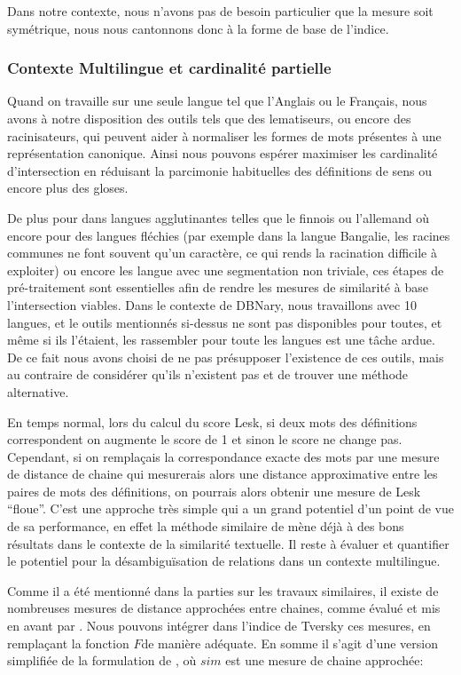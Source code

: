\documentclass[10pt,a4paper,twoside]{article}
\begin{document}
Dans notre contexte, nous n'avons pas de besoin particulier que la mesure soit symétrique, nous nous cantonnons donc à la forme de base de l'indice. 
 
\subsubsection{Contexte Multilingue et cardinalité partielle}
Quand on travaille sur une seule langue tel que l'Anglais ou le Français, nous avons à notre disposition des outils tels que des lematiseurs, ou encore des racinisateurs, qui peuvent aider à normaliser les formes de mots présentes à une représentation canonique. Ainsi nous pouvons espérer maximiser les cardinalité d'intersection en réduisant la parcimonie habituelles des définitions de sens ou encore plus des gloses. 

De plus pour dans langues agglutinantes telles que le finnois ou l'allemand où encore pour des langues fléchies (par exemple dans la langue Bangalie, les racines communes ne font souvent qu'un caractère, ce qui rends la racination difficile à exploiter) ou encore les langue avec une segmentation non triviale, ces étapes de pré-traitement sont essentielles afin de rendre les mesures de similarité à base l'intersection viables. Dans le contexte de DBNary, nous travaillons avec 10 langues, et le outils mentionnés si-dessus ne sont pas disponibles pour toutes, et même si ils l'étaient, les rassembler pour toute les langues est une tâche ardue. De ce fait nous avons choisi de ne pas présupposer l'existence de ces outils, mais au contraire de considérer qu'ils n'existent pas et de trouver une méthode alternative.

En temps normal, lors du calcul du score Lesk, si deux mots des définitions correspondent on augmente le score de 1 et sinon le score ne change pas. Cependant, si on remplaçais la correspondance exacte des mots par une mesure de distance de chaine qui mesurerais alors une distance approximative entre les paires de mots des définitions, on pourrais alors obtenir une mesure de Lesk ``floue''. C'est une approche très simple qui a un grand potentiel d'un point de vue de sa performance, en effet la méthode similaire de \cite{Jimenez2012} mène déjà à des bons résultats dans le contexte de la similarité textuelle. Il reste à évaluer et quantifier le potentiel pour la désambiguïsation de relations dans un contexte multilingue.

Comme il a été mentionné dans la parties sur les travaux similaires, il existe de nombreuses mesures de distance approchées entre chaines, comme évalué et mis en avant par \cite{Cohen2003}.
Nous pouvons intégrer dans l'indice de Tversky ces mesures, en remplaçant la fonction \(F\)de manière adéquate. En somme il s'agit d'une version simplifiée de la formulation de \cite{Jimenez2012}, où \(sim\) est une mesure de chaine approchée:
\end{document}
